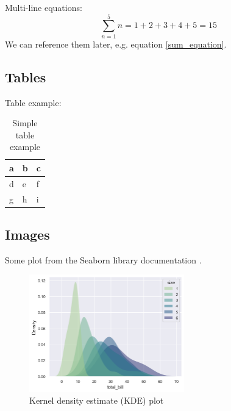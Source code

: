 \documentclass{pwrReport}
\begin{document}
        \noindent Multi-line equations:
        \begin{equation}
            \sum_{n=1}^{5} n = 1+2+3+4+5=15
            \label{sum_equation}
        \end{equation}
        \noindent We can reference them later, e.g. equation \ref{sum_equation}.

    \subsection{Tables}
        Table example:
        \begin{table}[h]
            \centering
            \begin{tabular}{|l|l|l|}
                \hline
                a & b & c \\ \hline
                d & e & f \\ \hline
                g & h & i \\ \hline
            \end{tabular}
            \caption{Simple table example}
        \end{table}

    \newpage
    \subsection{Images}
        Some plot from the Seaborn library documentation \cite{Waskom2021}.
        \begin{figure}[!htbp]%
            \centering
            \includegraphics[width=0.6\textwidth]{images/kdeplot.png}
            \caption{Kernel density estimate (KDE) plot }%
            \label{fig:wust_logo}
        \end{figure}
\end{document}
